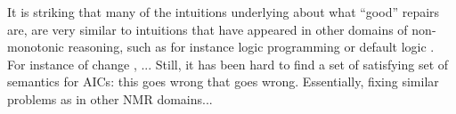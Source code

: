 
It is striking that many of the intuitions underlying about what ``good'' repairs are, are very similar to intuitions that have appeared in other domains of non-monotonic reasoning, such as for instance logic programming  or default logic . 
For instance  of change \cite{}, ... 
Still, it has been hard to find a set of satisfying set of semantics for AICs: this goes wrong that goes wrong. 
Essentially, fixing similar problems as in other NMR domains... 


